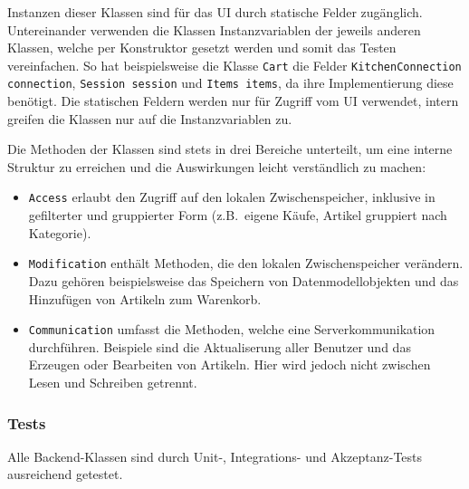 Instanzen dieser Klassen sind für das UI durch statische Felder zugänglich.
Untereinander verwenden die Klassen Instanzvariablen der jeweils anderen Klassen, welche per Konstruktor gesetzt werden und somit das Testen vereinfachen.
So hat beispielsweise die Klasse \texttt{Cart} die Felder \texttt{KitchenConnection connection}, \texttt{Session session} und \texttt{Items items}, da ihre Implementierung diese benötigt.
Die statischen Feldern werden nur für Zugriff vom UI verwendet, intern greifen die Klassen nur auf die Instanzvariablen zu.

Die Methoden der Klassen sind stets in drei Bereiche unterteilt, um eine interne Struktur zu erreichen und die Auswirkungen leicht verständlich zu machen:

\begin{itemize}
	\item \texttt{Access} erlaubt den Zugriff auf den lokalen Zwischenspeicher, inklusive in gefilterter und gruppierter Form (z.B.\ eigene Käufe, Artikel gruppiert nach Kategorie).
	\item \texttt{Modification} enthält Methoden, die den lokalen Zwischenspeicher verändern.
	Dazu gehören beispielsweise das Speichern von Datenmodellobjekten und das Hinzufügen von Artikeln zum Warenkorb.
	\item \texttt{Communication} umfasst die Methoden, welche eine Serverkommunikation durchführen.
	Beispiele sind die Aktualiserung aller Benutzer und das Erzeugen oder Bearbeiten von Artikeln.
	Hier wird jedoch nicht zwischen Lesen und Schreiben getrennt.
\end{itemize}

\subsubsection{Tests}

Alle Backend-Klassen sind durch Unit-, Integrations- und Akzeptanz-Tests ausreichend getestet.
